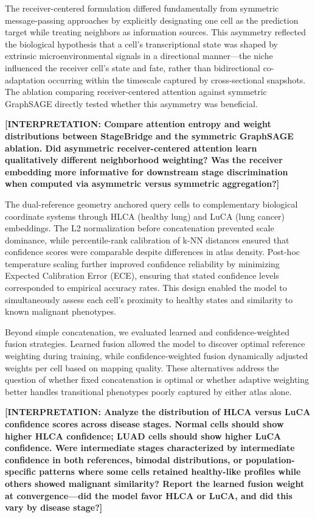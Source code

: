 The receiver-centered formulation differed fundamentally from symmetric message-passing approaches by explicitly designating one cell as the prediction target while treating neighbors as information sources. This asymmetry reflected the biological hypothesis that a cell's transcriptional state was shaped by extrinsic microenvironmental signals in a directional manner---the niche influenced the receiver cell's state and fate, rather than bidirectional co-adaptation occurring within the timescale captured by cross-sectional snapshots. The ablation comparing receiver-centered attention against symmetric GraphSAGE directly tested whether this asymmetry was beneficial.

\textbf{[INTERPRETATION: Compare attention entropy and weight distributions between StageBridge and the symmetric GraphSAGE ablation. Did asymmetric receiver-centered attention learn qualitatively different neighborhood weighting? Was the receiver embedding more informative for downstream stage discrimination when computed via asymmetric versus symmetric aggregation?]}

The dual-reference geometry anchored query cells to complementary biological coordinate systems through HLCA (healthy lung) and LuCA (lung cancer) embeddings. The L2 normalization before concatenation prevented scale dominance, while percentile-rank calibration of k-NN distances ensured that confidence scores were comparable despite differences in atlas density. Post-hoc temperature scaling further improved confidence reliability by minimizing Expected Calibration Error (ECE), ensuring that stated confidence levels corresponded to empirical accuracy rates. This design enabled the model to simultaneously assess each cell's proximity to healthy states and similarity to known malignant phenotypes.

Beyond simple concatenation, we evaluated learned and confidence-weighted fusion strategies. Learned fusion allowed the model to discover optimal reference weighting during training, while confidence-weighted fusion dynamically adjusted weights per cell based on mapping quality. These alternatives address the question of whether fixed concatenation is optimal or whether adaptive weighting better handles transitional phenotypes poorly captured by either atlas alone.

\textbf{[INTERPRETATION: Analyze the distribution of HLCA versus LuCA confidence scores across disease stages. Normal cells should show higher HLCA confidence; LUAD cells should show higher LuCA confidence. Were intermediate stages characterized by intermediate confidence in both references, bimodal distributions, or population-specific patterns where some cells retained healthy-like profiles while others showed malignant similarity? Report the learned fusion weight at convergence---did the model favor HLCA or LuCA, and did this vary by disease stage?]}


